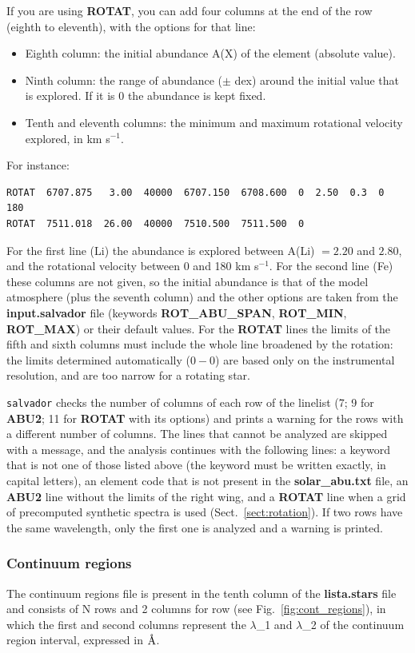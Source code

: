 \documentclass[modern]{aastex701}
\newcommand{\angstrom}{\mbox{\normalfont\AA}}
\begin{document}
If you are using {\bf ROTAT}, you can add four columns at the end of the row (eighth to eleventh), with the options for that line:
\begin{itemize}
    \item Eighth column: the initial abundance A(X) of the element (absolute value).
    \item Ninth column: the range of abundance ($\pm$ dex) around the initial value that is explored. If it is 0 the abundance is kept fixed.
    \item Tenth and eleventh columns: the minimum and maximum rotational velocity explored, in km s$^{-1}$.
\end{itemize}
For instance:
{\small
\begin{verbatim}
ROTAT  6707.875   3.00  40000  6707.150  6708.600  0  2.50  0.3  0  180
ROTAT  7511.018  26.00  40000  7510.500  7511.500  0
\end{verbatim}
}
For the first line (Li) the abundance is explored between A(Li) $= 2.20$ and $2.80$, and the rotational velocity between 0 and 180 km s$^{-1}$. For the second line (Fe) these columns are not given, so the initial abundance is that of the model atmosphere (plus the seventh column) and the other options are taken from the {\bf input.salvador} file (keywords {\bf ROT\_ABU\_SPAN}, {\bf ROT\_MIN}, {\bf ROT\_MAX}) or their default values. For the {\bf ROTAT} lines the limits of the fifth and sixth columns must include the whole line broadened by the rotation: the limits determined automatically ($0-0$) are based only on the instrumental resolution, and are too narrow for a rotating star. 

\texttt{salvador} checks the number of columns of each row of the linelist (7; 9 for {\bf ABU2}; 11 for {\bf ROTAT} with its options) and prints a warning for the rows with a different number of columns. The lines that cannot be analyzed are skipped with a message, and the analysis continues with the following lines: a keyword that is not one of those listed above (the keyword must be written exactly, in capital letters), an element code that is not present in the {\bf solar\_abu.txt} file, an {\bf ABU2} line without the limits of the right wing, and a {\bf ROTAT} line when a grid of precomputed synthetic spectra is used (Sect.~\ref{sect:rotation}). If two rows have the same wavelength, only the first one is analyzed and a warning is printed.

\subsubsection{Continuum regions} \label{sect:continuum_regions}
The continuum regions file is present in the tenth column of the {\bf lista.stars} file and  consists of N rows and 2 columns for row (see Fig.~\ref{fig:cont_regions}), in which the first and second columns represent the $\lambda$\_1 and $\lambda$\_2 of the continuum region interval, expressed in $\angstrom$. 
\end{document}
